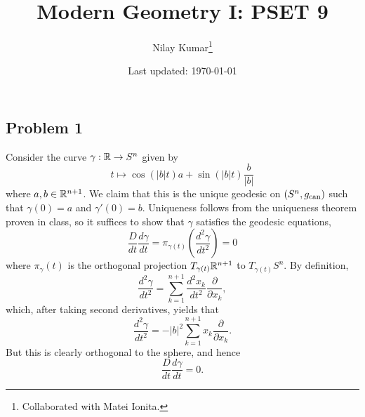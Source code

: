 \documentclass{../mathnotes}
\title{Modern Geometry I: PSET 9}
\author{Nilay Kumar\footnote{Collaborated with Matei Ionita.}}
\date{Last updated: \today}
\begin{document}
\maketitle

\subsection*{Problem 1}
Consider the curve $\gamma:\mathbb{R}\to S^n$ given by
\[t\mapsto \cos\left( |b|t \right)a + \sin\left( |b|t \right)\frac{b}{|b|}\]
where $a,b\in\mathbb{R}^{n+1}$. We claim that this is the unique geodesic on $(S^n,g_{\rm can})$
such that $\gamma(0)=a$ and $\gamma'(0)=b$. Uniqueness follows from the uniqueness
theorem proven in class, so it suffices to show that $\gamma$ satisfies the
geodesic equations,
\[\frac{D}{dt}\frac{d\gamma}{dt}=\pi_{\gamma(t)}\left( \frac{d^2\gamma}{dt^2} \right)=0\]
where $\pi_{\gamma}(t)$ is the orthogonal projection $T_{\gamma(t)}\mathbb{R}^{n+1}$ to
$T_{\gamma(t)}S^n$. By definition,
\[\frac{d^2\gamma}{dt^2}=\sum_{k=1}^{n+1}\frac{d^2x_k}{dt^2}\frac{\partial}{\partial x_k},\]
which, after taking second derivatives, yields that
\[\frac{d^2\gamma}{dt^2}=-|b|^2\sum_{k=1}^{n+1}x_k\frac{\partial}{\partial x_k}.\]
But this is clearly orthogonal to the sphere, and hence 
\[\frac{D}{dt}\frac{d\gamma}{dt}=0.\]
\end{document}
